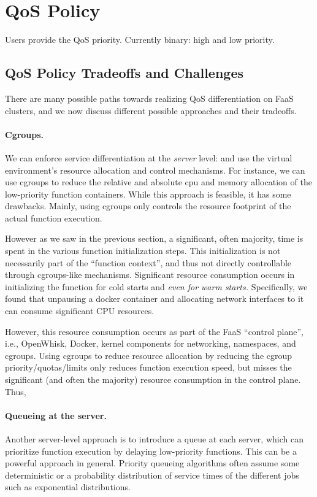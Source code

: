 \section{QoS Policy}

Users provide the QoS priority. Currently binary: high and low priority. 

\subsection{QoS Policy Tradeoffs and Challenges}

There are many possible paths towards realizing QoS differentiation on FaaS clusters, and we now discuss different possible approaches and their tradeoffs.

\paragraph{Cgroups.} We can enforce service differentiation at the \emph{server} level: and use the virtual environment's resource allocation and control mechanisms.
For instance, we can use cgroups to reduce the relative and absolute cpu and memory allocation of the low-priority function containers.
While this approach is feasible, it has some drawbacks.
Mainly, using cgroups only controls the resource footprint of the actual function execution.

However as we saw in the previous section, a significant, often majority, time is spent in the various function initialization steps.
This initialization is not necessarily part of the ``function context'', and thus not directly controllable through cgroups-like mechanisms.
Significant resource consumption occurs in initializing the function for cold starts and \emph{even for warm starts.}
Specifically, we found that unpausing a docker container and allocating network interfaces to it can consume significant CPU resources.

However, this resource consumption occurs as part of the FaaS ``control plane'', i.e., OpenWhisk, Docker, kernel components for networking, namespaces, and cgroups.
Using cgroups to reduce resource allocation by reducing the cgroup priority/quotas/limits only reduces function execution speed, but misses the significant (and often the majority) resource consumption in the control plane.
Thus,

\paragraph{Queueing at the server.}
Another server-level approach is to introduce a queue at each server, which can prioritize function execution by delaying low-priority functions.
This can be a  powerful approach in general.
Priority queueing algorithms often assume some deterministic or a probability distribution of service times of the different jobs such as exponential distributions.

